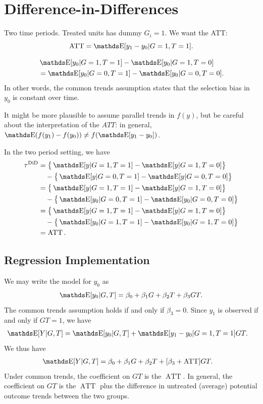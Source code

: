 \documentclass[letterpaper, 10pt]{article}
\DeclareMathOperator{\ATT}{ATT}
\begin{document}
\section{Difference-in-Differences}
\begin{example}
  Two time periods.
  Treated units has dummy \(G_i = 1\).
  We want the ATT:
  \[
    \ATT
    = \E[y_1 - y_0|G = 1, T = 1].
  \]
\end{example}

\begin{assumption}
  \begin{align*}
    &\E[y_0|G = 1, T = 1] - \E[y_0|G = 1, T = 0] \\
    &= \E[y_0|G = 0, T = 1] - \E[y_0|G = 0, T = 0].
  \end{align*}
  In other words, the common trends assumption states that the selection bias in \(y_0\) is constant over time.
\end{assumption}
\begin{remark}
  It might be more plausible to assume parallel trends in \(f(y)\), but be careful about the interpretation of the \(ATT\): in general, \(\E(f(y_1) - f(y_0)) \neq f(\E[y_1 - y_0])\).
\end{remark}


In the two period setting, we have
\begin{align*}
  \tau^{\mathrm{DiD}}
  &= \big\{ \E[y|G = 1, T = 1] - \E[y|G = 1, T = 0] \big\} \\
  &\quad- \big\{ \E[y|G = 0, T = 1] - \E[y|G = 0, T = 0] \big\} \\
  &= \big\{ \E[y|G = 1, T = 1] - \E[y|G = 1, T = 0] \big\} \\
  &\quad- \big\{ \E[y_0|G = 0, T = 1] - \E[y_0|G = 0, T = 0] \big\} \\
  &= \big\{ \E[y|G = 1, T = 1] - \E[y|G = 1, T = 0] \big\} \\
  &\quad- \big\{ \E[y_0|G = 1, T = 1] - \E[y_0|G = 1, T = 0] \big\} \\
  &= \ATT.
\end{align*}


\subsection{Regression Implementation}
We may write the model for \(y_0\) as
\[
  \E[y_0|G, T]
  = \beta_0 + \beta_1 G + \beta_2 T + \beta_3 GT.
\]
The common trends assumption holds if and only if \(\beta_3 = 0\).
Since \(y_1\) is observed if and only if \(GT = 1\), we have
\begin{align*}
  \E[Y|G, T]
  &= \E[y_0|G, T] + \E[y_1 - y_0|G = 1, T = 1] GT.
\end{align*}
We thus have
\begin{align*}
  \E[Y|G, T]
  &= \beta_0 + \beta_1 G + \beta_2 T + [\beta_3 + \ATT] GT.
\end{align*}
Under common trends, the coefficient on \(GT\) is the \(\ATT\).
In general, the coefficient on \(GT\) is the \(\ATT\) plus the difference in untreated (average) potential outcome trends between the two groups.
\end{document}
